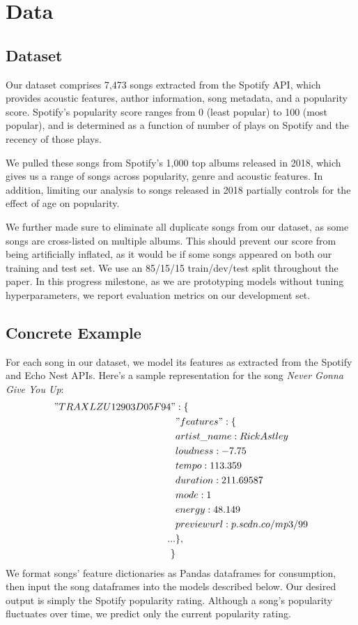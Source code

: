 \documentclass[journal]{IEEEtran}
\begin{document}
\section{Data}
\subsection{Dataset}
Our dataset comprises 7,473 songs extracted from the Spotify API, which provides acoustic features, author information, song metadata, and a popularity score. Spotify's popularity score ranges from 0 (least popular) to 100 (most popular), and is determined as a function of number of plays on Spotify and the recency of those plays.

We pulled these songs from Spotify's 1,000 top albums released in 2018, which gives us a range of songs across popularity, genre and acoustic features. In addition, limiting our analysis to songs released in 2018 partially controls for the effect of age on popularity.

We further made sure to eliminate all duplicate songs from our dataset, as some songs are cross-listed on multiple albums. This should prevent our score from being artificially inflated, as it would be if some songs appeared on both our training and test set. We use an 85/15/15 train/dev/test split throughout the paper. In this progress milestone, as we are prototyping models without tuning hyperparameters, we report evaluation metrics on our development set.


\subsection{Concrete Example}
For each song in our dataset, we model its features as extracted from the Spotify and Echo Nest APIs. Here's a sample representation for the song \textit{Never Gonna Give You Up}:
\begin{align*}
    "TRAXLZU12903D05F94 "&: \{ \\
  &"features": \{\\
  &artist\_name: Rick Astley \\
  &loudness: -7.75 \\
  &tempo: 113.359 \\
  &duration: 211.69587 \\
  &mode: 1 \\
  &energy: 48.149 \\
  &previewurl: p.scdn.co/mp3/99 \\
  ...
        &\},\\
    \}
\end{align*}
We format songs' feature dictionaries as Pandas dataframes for consumption, then input the song dataframes into the models described below. Our desired output is simply the Spotify popularity rating. Although a song's popularity fluctuates over time, we predict only the current popularity rating.
\end{document}
